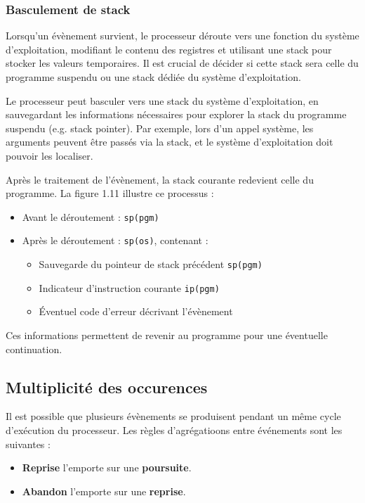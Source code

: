 \subsubsection{Basculement de stack}

Lorsqu’un évènement survient, le processeur déroute vers une fonction du système d’exploitation, modifiant le contenu des registres et utilisant une stack pour stocker les valeurs temporaires. Il est crucial de décider si cette stack sera celle du programme suspendu ou une stack dédiée du système d’exploitation.

Le processeur peut basculer vers une stack du système d’exploitation, en sauvegardant les informations nécessaires pour explorer la stack du programme suspendu (e.g. stack pointer). Par exemple, lors d'un appel système, les arguments peuvent être passés via la stack, et le système d’exploitation doit pouvoir les localiser.

Après le traitement de l’évènement, la stack courante redevient celle du programme. La figure 1.11 illustre ce processus :
\begin{itemize}
    \item Avant le déroutement : \texttt{sp(pgm)}
    \item Après le déroutement : \texttt{sp(os)}, contenant :
    \begin{itemize}
        \item Sauvegarde du pointeur de stack précédent \texttt{sp(pgm)}
        \item Indicateur d’instruction courante \texttt{ip(pgm)}
        \item Éventuel code d’erreur décrivant l’évènement
    \end{itemize}
\end{itemize}

Ces informations permettent de revenir au programme pour une éventuelle continuation.



\subsection{Multiplicité des occurences}

Il est possible que plusieurs évènements se produisent pendant un même cycle d’exécution du processeur. 
Les règles d'agrégatioons entre événements sont les suivantes :

\begin{itemize}
    \item \textbf{Reprise} l’emporte sur une \textbf{poursuite}.
    \item \textbf{Abandon} l’emporte sur une \textbf{reprise}.
\end{itemize}

